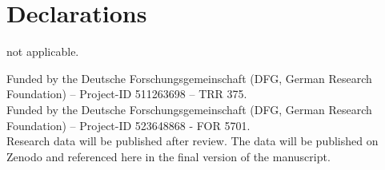 \documentclass[pdflatex,sn-mathphys-num]{sn-jnl}%
\theoremstyle{thmstyleone}%
\theoremstyle{thmstyletwo}%
\theoremstyle{thmstylethree}%
\begin{document}


\section*{Declarations}

 not applicable.

 Funded by the Deutsche Forschungsgemeinschaft (DFG, German Research Foundation) – Project-ID 511263698 – TRR 375.\\
  Funded by the Deutsche Forschungsgemeinschaft (DFG, German Research Foundation) – Project-ID 523648868 - FOR 5701.\\

   Research data will be published after review. The data will be published on Zenodo and referenced here in the final version of the manuscript.



\end{document}
